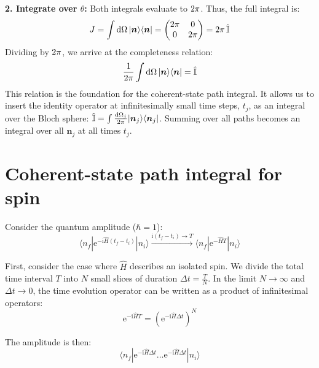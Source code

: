 \textbf{2. Integrate over $\theta$:}
Both integrals evaluate to $2\mathrm{\pi}$. Thus, the full integral is:
\begin{equation}
    J = \int \mathrm{d}\Omega \, |\bm{n}\rangle\langle\bm{n}| = \begin{pmatrix} 2\mathrm{\pi} & 0 \\ 0 & 2\mathrm{\pi} \end{pmatrix} = 2\mathrm{\pi} \, \hat{\mathbb{I}}
\end{equation}
Dividing by $2\mathrm{\pi}$, we arrive at the completeness relation:
\begin{equation}
    \frac{1}{2\mathrm{\pi}} \int \mathrm{d}\Omega \, |\bm{n}\rangle\langle\bm{n}| = \hat{\mathbb{I}}
\end{equation}
This relation is the foundation for the coherent-state path integral. It allows us to insert the identity operator at infinitesimally small time steps, $t_j$, as an integral over the Bloch sphere: $\hat{\mathbb{I}} = \int \frac{\mathrm{d}\Omega_j}{2\mathrm{\pi}} |\bm{n}_j\rangle\langle\bm{n}_j|$. Summing over all paths becomes an integral over all $\bm{n}_j$ at all times $t_j$.

\section{Coherent-state path integral for spin}

Consider the quantum amplitude ($\hbar=1$):
\begin{equation}
\langle n_f | \mathrm{e}^{-\mathrm{i}\hat{H}(t_f-t_i)} |n_i\rangle \xrightarrow{\mathrm{i}(t_f-t_i) \rightarrow T} \langle n_f | \mathrm{e}^{-\hat{H}T} |n_i\rangle
\end{equation}

First, consider the case where $\hat{H}$ describes an isolated spin.
We divide the total time interval $T$ into $N$ small slices of
duration $\Delta t = \frac{T}{N}$. In the limit $N \to \infty$ and $\Delta t \to 0$, the time evolution
operator can be written as a product of infinitesimal operators:
\begin{equation}
\mathrm{e}^{-\mathrm{i}\hat{H}T} = \left( \mathrm{e}^{-\mathrm{i}\hat{H}\Delta t} \right)^N
\end{equation}

The amplitude is then:
\begin{equation}
\langle n_f | \mathrm{e}^{-\mathrm{i}\hat{H}\Delta t} \dots \mathrm{e}^{-\mathrm{i}\hat{H}\Delta t} |n_i\rangle
\end{equation}

